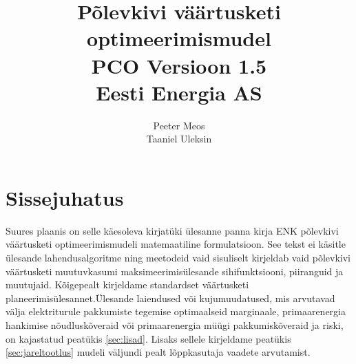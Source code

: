 \documentclass[10pt,a4paper]{article}
\author{Peeter Meos\\Taaniel Uleksin}
\title{Põlevkivi väärtusketi optimeerimismudel \\ 
PCO Versioon 1.5\\
Eesti Energia AS}
\begin{document}
\maketitle
\tableofcontents
\listoffigures
\listoftables

\section{Sissejuhatus}
Suures plaanis on selle käesoleva kirjatüki ülesanne panna kirja ENK põ\-lev\-kivi väärtusketi optimeerimismudeli matemaatiline formulatsioon. See tekst ei käsitle ülesande lahendusalgoritme ning meetodeid vaid sisuliselt kirjeldab vaid põlev\-kivi väärtusketi muutuvkasumi maksimeerimisülesande sihifunktsiooni, pii\-ranguid ja muutujaid. Kõigepealt kirjeldame standardset väärtusketi pla\-neeri\-mis\-ülesannet.Üles\-ande laiendused või kujumuudatused, mis arvu\-tavad väl\-ja elek\-tri\-turule pakkumiste tegemise optimaalseid marginaale, primaarenergia hankimise nõudlus\-kõveraid või primaar\-energia müügi pakkumiskõveraid ja riski, on kajastatud peatükis \ref{sec:lisad}. Lisaks sellele kirjeldame peatükis \ref{sec:jareltootlus} mudeli väljundi pealt lõpp\-kasutaja vaadete arvutamist.
\end{document}
